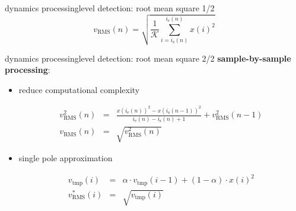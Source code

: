 \begin{frame}{dynamics processing}{level detection: root mean square 1/2}
	\begin{equation*}\label{eq:rms}
		v_{\mathrm{RMS}}(n) = \sqrt{\frac{1}{\mathcal{K}}\sum\limits_{i=i_{\mathrm{s}}(n)}^{i_{\mathrm{e}}(n)}{x(i)^2}}
	\end{equation*}
\end{frame}
\begin{frame}{dynamics processing}{level detection: root mean square 2/2}
			\textbf{sample-by-sample processing}:
			\begin{itemize}
				\item	reduce computational complexity
					\begin{footnotesize}
					\begin{eqnarray*}
						v^2_{\mathrm{RMS}}(n) &=& \frac{x(i_{\mathrm{e}}(n))^2 - x(i_{\mathrm{s}}(n-1))^2}{i_{\mathrm{e}}(n)-i_{\mathrm{s}}(n) + 1} + v^2_{\mathrm{RMS}}(n-1) \\
						v_{\mathrm{RMS}}(n)	&=& \sqrt{v^2_{\mathrm{RMS}}(n)}
					\end{eqnarray*}
					\end{footnotesize}
				\pause
				\item	single pole approximation
					\begin{footnotesize}
					\begin{eqnarray*}
						v_\mathrm{tmp}(i)	&=& \alpha\cdot v_\mathrm{tmp}(i-1) + (1-\alpha)\cdot x(i)^2\\
						v^*_{\mathrm{RMS}}(i)		&=& \sqrt{v_\mathrm{tmp}(i)}
					\end{eqnarray*}
					\end{footnotesize}
			\end{itemize}
\end{frame}
